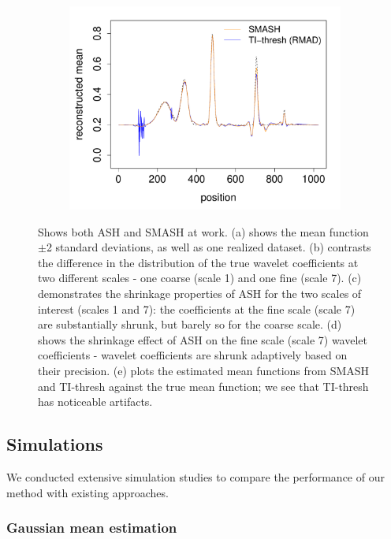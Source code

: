 \documentclass[12pt]{article}
\begin{document}
\begin{figure}
\begin{subfigure}[b]{0.48\textwidth}
        \includegraphics[width=\textwidth]{simple_eg_5.pdf}
        \caption{}
        \label{fig:simple_eg_5}
    \end{subfigure}
    \caption{Shows both ASH and SMASH at work. (a) shows the mean function $\pm$2 standard deviations, as well as one realized dataset. (b) contrasts the difference in the distribution of the true wavelet coefficients at two different scales - one coarse (scale 1) and one fine (scale 7). (c) demonstrates the shrinkage properties of ASH for the two scales of interest (scales 1 and 7): the coefficients at the fine scale (scale 7) are substantially shrunk, but barely so for the coarse scale. (d) shows the shrinkage effect of ASH on the fine scale (scale 7) wavelet coefficients - wavelet coefficients are shrunk adaptively based on their precision. (e) plots the estimated mean functions from SMASH and TI-thresh against the true mean function; we see that TI-thresh has noticeable artifacts.}
    \label{fig:simple_eg}
\end{figure}

\subsection{Simulations}

We conducted extensive simulation studies to compare the performance of our method with existing approaches.
 
 \subsubsection{Gaussian mean estimation}
 
\end{document}
